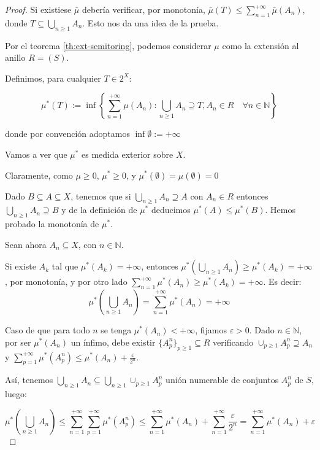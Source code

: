 \begin{proof}
 Si existiese $\bar{\mu}$ debería verificar, por monotonía, $\bar{\mu}(T) \le \sum_{n=1}^{+\infty} \bar{\mu}(A_n)$, 
 donde $T \subseteq \bigcup_{n\ge 1} A_n$. Esto nos da una idea de la prueba.
 
 Por el teorema \ref{th:ext-semitoring}, podemos considerar $\mu$ como la extensión al anillo $R=(S)$.
 
 Definimos, para cualquier $T\in 2^X$:
 
 \[\mu^\ast(T):= \inf\left\{\sum_{n=1}^{+\infty} \mu(A_n): \bigcup_{n\ge 1} A_n \supseteq T,
                 A_n\in R \quad \forall n\in\mathbb{N}\right\}\]

 donde por convención adoptamos $\inf \emptyset := +\infty$
 
 Vamos a ver que $\mu^\ast$ es medida exterior sobre $X$.
 
 Claramente, como $\mu \ge 0$, $\mu^\ast \ge 0$, y $\mu^\ast(\emptyset) = \mu(\emptyset) = 0$
 
 Dado $B\subseteq A \subseteq X$, tenemos que si $\bigcup_{n\ge 1} A_n \supseteq A$ con $A_n\in R$
 entonces $\bigcup_{n\ge 1} A_n \supseteq B$ y de la definición de $\mu^\ast$ deducimos $\mu^\ast(A) \le \mu^\ast(B)$.
 Hemos probado la monotonía de $\mu^\ast$.
 
 Sean ahora $A_n \subseteq X$, con $n\in \mathbb{N}$.
 
 Si existe $A_k$ tal que $\mu^\ast(A_k) = +\infty$, entonces $\mu^\ast\left(\bigcup_{n\ge 1} A_n\right) \ge \mu^\ast(A_k) = +\infty$, 
 por monotonía, y por otro lado $\sum_{n=1}^{+\infty} \mu^\ast(A_n) \ge \mu^\ast(A_k) = +\infty$. Es decir:
 \[\mu^\ast\left(\bigcup_{n\ge 1} A_n\right) = \sum_{n=1}^{+\infty} \mu^\ast(A_n) = +\infty\]
 
 Caso de que para todo $n$ se tenga $\mu^\ast(A_n) < +\infty$, fijamos $\varepsilon > 0$.
 Dado $n\in \mathbb{N}$, por ser $\mu^\ast(A_n)$ un ínfimo, debe existir $\{A_p^n\}_{p\ge 1}\subseteq R$
 verificando $\cup_{p\ge 1} A_p^n \supseteq A_n$ y $\sum_{p=1}^{+\infty} \mu^\ast(A_p^n) \le \mu^\ast(A_n) + \frac{\varepsilon}{2^n}$.
 
 Así, tenemos $\bigcup_{n\ge 1} A_n \subseteq \bigcup_{n\ge 1} \cup_{p\ge 1} A_p^n$ unión numerable
 de conjuntos $A_p^n$ de $S$, luego:
 
 \[\mu^\ast \left(\bigcup_{n\ge 1} A_n \right) \le \sum_{n=1}^{+\infty} \sum_{p=1}^{+\infty} \mu^\ast(A_p^n)
   \le \sum_{n=1}^{+\infty}\mu^\ast(A_n) + \sum_{n=1}^{+\infty}\frac{\varepsilon}{2^n} = 
   \sum_{n=1}^{+\infty}\mu^\ast(A_n) + \varepsilon\]
 

\end{proof}
